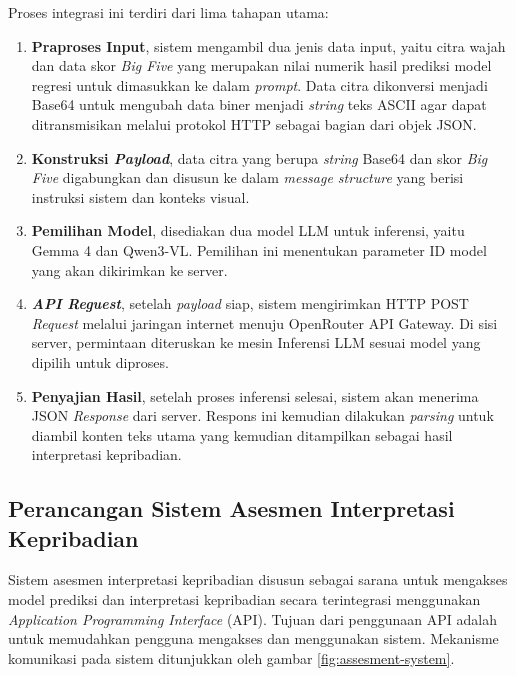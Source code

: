 Proses integrasi ini terdiri dari lima tahapan utama:

\begin{enumerate}[nosep]
	\item \textbf{Praproses Input}, sistem mengambil dua jenis data input, yaitu citra wajah dan data skor \textit{Big Five} yang merupakan nilai numerik hasil prediksi model regresi untuk dimasukkan ke dalam \textit{prompt}. Data citra dikonversi menjadi Base64 untuk mengubah data biner menjadi \textit{string} teks ASCII agar dapat ditransmisikan melalui protokol HTTP sebagai bagian dari objek JSON.

	\item \textbf{Konstruksi \textit{Payload}}, data citra yang berupa \textit{string} Base64 dan skor \textit{Big Five} digabungkan dan disusun ke dalam \textit{message structure} yang berisi instruksi sistem dan konteks visual.

	\item \textbf{Pemilihan Model}, disediakan dua model LLM untuk inferensi, yaitu Gemma 4 dan Qwen3-VL. Pemilihan ini menentukan parameter ID model yang akan dikirimkan ke server.

	\item \textbf{\textit{API Reguest}}, setelah \textit{payload} siap, sistem mengirimkan HTTP POST \textit{Request} melalui jaringan internet menuju OpenRouter API Gateway. Di sisi server, permintaan diteruskan ke mesin Inferensi LLM sesuai model yang dipilih untuk diproses.

	\item \textbf{Penyajian Hasil}, setelah proses inferensi selesai, sistem akan menerima JSON \textit{Response} dari server. Respons ini kemudian dilakukan \textit{parsing} untuk diambil konten teks utama yang kemudian ditampilkan sebagai hasil interpretasi kepribadian.
\end{enumerate}

\subsection{Perancangan Sistem Asesmen Interpretasi Kepribadian}

Sistem asesmen interpretasi kepribadian disusun sebagai sarana untuk mengakses model prediksi dan interpretasi kepribadian secara terintegrasi menggunakan \textit{Application Programming Interface} (API). Tujuan dari penggunaan API adalah untuk memudahkan pengguna mengakses dan menggunakan sistem. Mekanisme komunikasi pada sistem ditunjukkan oleh gambar \ref{fig:assesment-system}.

